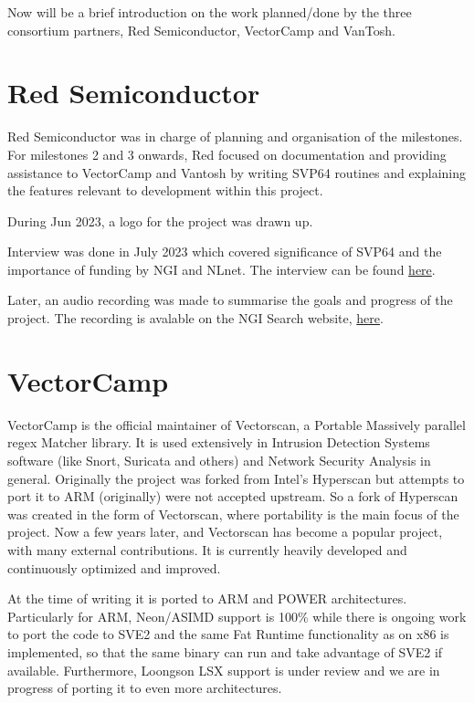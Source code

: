 Now will be a brief introduction on the work planned/done by the three
consortium partners, Red Semiconductor, VectorCamp and VanTosh.

\section{Red Semiconductor}

Red Semiconductor was in charge of planning and organisation of the milestones.
For milestones 2 and 3 onwards, Red focused on documentation and providing
assistance to VectorCamp and Vantosh by writing \acrshort{SVP64} routines and explaining
the features relevant to development within this project.

During Jun 2023, a logo for the project was drawn up.

Interview was done in July 2023 which covered significance of \acrshort{SVP64} and
the importance of funding by \acrshort{NGI} and NLnet.
The interview can be found
\href{https://spaces.fundingbox.com/spaces/ngi-community-ngi-innovators/64b8dadbabf7a659885ee01e}{here}.

Later, an audio recording was made to summarise the goals and progress of the
project. The recording is avalable on the NGI Search website, 
\href{https://www.ngisearch.eu/view/Events/OC1Searchers}{here}.

\section{VectorCamp}

VectorCamp is the official maintainer of Vectorscan, a Portable Massively
parallel \acrfull{regex} Matcher library. It is used extensively in
Intrusion Detection Systems software (like Snort, Suricata and others)
and Network Security Analysis in general. Originally the project was forked
from Intel’s Hyperscan but attempts to port it to ARM (originally) were not
accepted upstream. So a fork of Hyperscan was created in the form of
Vectorscan, where portability is the main focus of the project.
Now a few years later, and Vectorscan has become a popular project,
with many external contributions. It is currently heavily developed and
continuously optimized and improved.

At the time of writing it is ported
to ARM and \acrshort{POWER} architectures. Particularly for ARM, Neon/ASIMD support
is 100\% while there is ongoing work to port the code to \acrshort{SVE2} and
the same Fat Runtime functionality as on x86 is implemented,
so that the same binary can run and take advantage of \acrshort{SVE2} if available.
Furthermore, Loongson LSX support is under review and we are in progress of
porting it to even more architectures.

